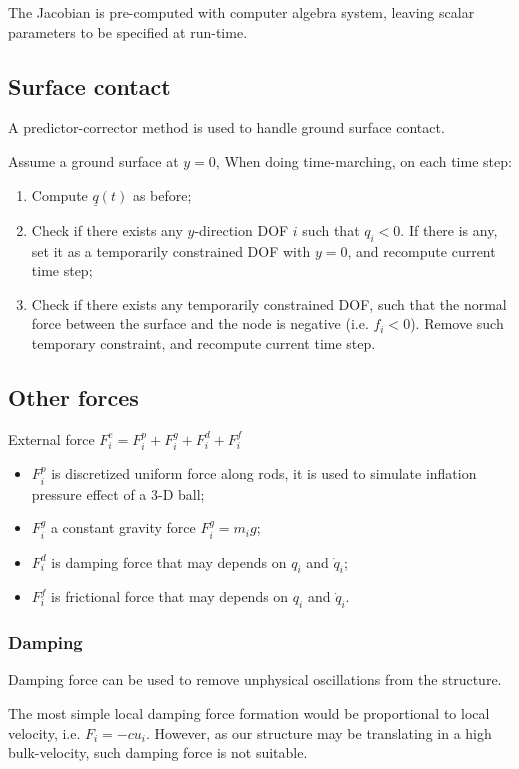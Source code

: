 \documentclass[letterpaper,9pt]{article}
\begin{document}
\begin{multicols}{2}
				The Jacobian is pre-computed with computer algebra system, leaving scalar parameters to be specified at run-time.
		\subsection{Surface contact}
			A predictor-corrector method is used to handle ground surface contact.
			
			Assume a ground surface at $y = 0$, When doing time-marching, on each time step:
			\begin{enumerate}
				\item Compute $\underline q(t)$ as before;
				\item Check if there exists any $y$-direction DOF $i$ such that $q_i < 0$. If there is any, set it as a temporarily constrained DOF with $y = 0$, and recompute current time step;
				\item Check if there exists any temporarily constrained DOF, such that the normal force between the surface and the node is negative (i.e. $f_i < 0$). Remove such temporary constraint, and recompute current time step.
			\end{enumerate}
		\subsection{Other forces}
			External force $F_i^e = F_i^p + F_i^g + F_i^d + F_i^f$
			\begin{itemize}
				\item $F_i^p$ is discretized uniform force along rods, it is used to simulate inflation pressure effect of a 3-D ball;
				\item $F_i^g$ a constant gravity force $F_i^g = m_ig$;
				\item $F_i^d$ is damping force that may depends on $q_i$ and $\dot q_i$;
				\item $F_i^f$ is frictional force that may depends on $q_i$ and $\dot q_i$.
			\end{itemize}
			\subsubsection{Damping}
				Damping force can be used to remove unphysical oscillations from the structure.
			
				The most simple local damping force formation would be proportional to local velocity, i.e. $F_i = -cu_i$. However, as our structure may be translating in a high bulk-velocity, such damping force is not suitable.
				

\end{multicols}
\end{document}
